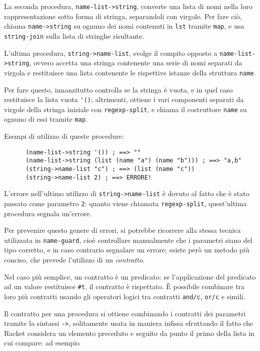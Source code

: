 La seconda procedura, \lstinline{name-list->string}, converte una lista
di nomi nella loro rappresentazione sotto forma di stringa, separandoli
con virgole. Per fare ci\`o, chiama \lstinline{name->string} su ognuno dei
nomi contenuti in \lstinline{lst} tramite \lstinline{map}, e usa
\lstinline{string-join} sulla lista di stringhe risultante.

L'ultima procedura, \lstinline{string->name-list}, svolge il compito opposto
a \lstinline{name-list->string}, ovvero accetta una stringa contenente una
serie di nomi separati da virgola e restituisce una lista contenente le
rispettive istanze della struttura \lstinline{name}.

Per fare questo, innanzitutto controlla se la stringa \`e vuota, e in quel
caso restituisce la lista vuota \lstinline{'()}; altrimenti, ottiene i vari
componenti separati da virgole della stringa iniziale con
\lstinline{regexp-split}, e chiama il costruttore \lstinline{name} su
ognuno di essi tramite \lstinline{map}.

Esempi di utilizzo di queste procedure:

\begin{lstlisting}
      (name-list->string '()) ; ==> ""
      (name-list->string (list (name "a") (name "b"))) ; ==> "a,b"
      (string->name-list "c") ; ==> (list (name "c"))
      (string->name-list 2) ; ==> ERRORE!
\end{lstlisting}

L'errore nell'ultimo utilizzo di \lstinline{string->name-list} \`e dovuto
al fatto che \`e stato passato come parametro \lstinline{2}: quanto viene
chiamata \lstinline{regexp-split}, quest'ultima procedura segnala un'errore.

Per prevenire questo genere di errori, si potrebbe ricorrere alla stessa
tecnica utilizzata in \lstinline{name-guard}, cio\`e controllare manualmente
che i parametri siano del tipo corretto, e in caso contrario segnalare un
errore; esiste per\`o un metodo pi\`u conciso, che prevede l'utilizzo di
un \emph{contratto}.

Nel caso pi\`u semplice, un contratto \`e un predicato: se l'applicazione
del predicato ad un valore restituisce \lstinline{#t}, il contratto \`e
rispettato. \`E possibile combinare tra loro pi\`u contratti usando gli
operatori logici tra contratti \lstinline{and/c}, \lstinline{or/c} e simili.

Il contratto per una procedura si ottiene combinando i contratti dei
parametri tramite la sintassi \lstinline{->}, solitamente usata in maniera
infissa sfruttando il fatto che Racket considera un elemento preceduto e
seguito da punto il primo della lista in cui compare: ad esempio

